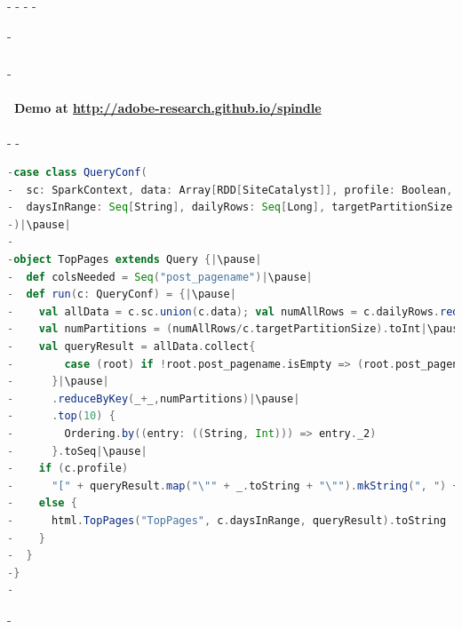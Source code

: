 -
-
-\iffalse
-\begin{frame}[fragile]
-  \frametitle{\insertsection}
-  \framesubtitle{\insertsubsection~Demo at \url{http://adobe-research.github.io/spindle}}
-
-  \begin{lstlisting}[language=scala]
-case class QueryConf(
-  sc: SparkContext, data: Array[RDD[SiteCatalyst]], profile: Boolean,
-  daysInRange: Seq[String], dailyRows: Seq[Long], targetPartitionSize: Long
-)|\pause|
-
-object TopPages extends Query {|\pause|
-  def colsNeeded = Seq("post_pagename")|\pause|
-  def run(c: QueryConf) = {|\pause|
-    val allData = c.sc.union(c.data); val numAllRows = c.dailyRows.reduce(_+_)
-    val numPartitions = (numAllRows/c.targetPartitionSize).toInt|\pause|
-    val queryResult = allData.collect{
-        case (root) if !root.post_pagename.isEmpty => (root.post_pagename, 1)
-      }|\pause|
-      .reduceByKey(_+_,numPartitions)|\pause|
-      .top(10) {
-        Ordering.by((entry: ((String, Int))) => entry._2)
-      }.toSeq|\pause|
-    if (c.profile)
-      "[" + queryResult.map("\"" + _.toString + "\"").mkString(", ") + "]"|\pause|
-    else {
-      html.TopPages("TopPages", c.daysInRange, queryResult).toString
-    }
-  }
-}
-  \end{lstlisting}
-\end{frame}
